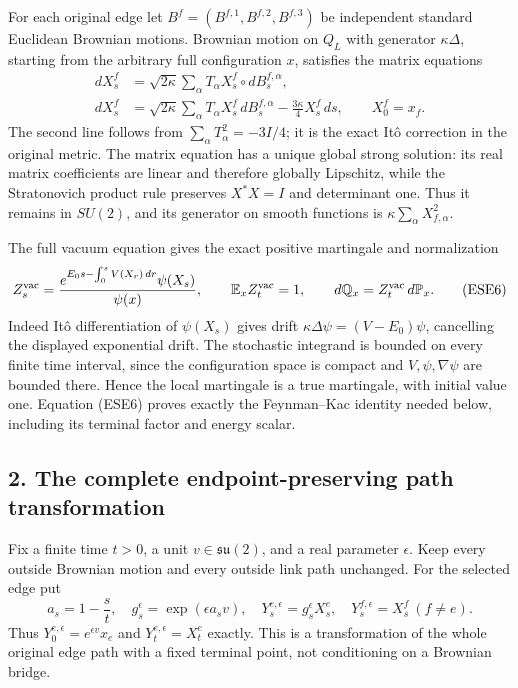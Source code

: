 \documentclass[11pt]{article}
\begin{document}
For each original edge let \(B^f=(B^{f,1},B^{f,2},B^{f,3})\) be independent standard Euclidean Brownian motions. Brownian motion on \(Q_L\) with generator \(\kappa\Delta\), starting from the arbitrary full configuration \(x\), satisfies the matrix equations
\[
 \begin{aligned}
 dX_s^f&=\sqrt{2\kappa}\sum_\alpha T_\alpha X_s^f\circ dB_s^{f,\alpha},\\
 dX_s^f&=\sqrt{2\kappa}\sum_\alpha T_\alpha X_s^f\,dB_s^{f,\alpha}
                     -\frac{3\kappa}{4}X_s^f\,ds,\qquad X_0^f=x_f.
 \end{aligned}\tag{ESE5}
\]
The second line follows from \(\sum_\alpha T_\alpha^2=-3I/4\); it is the exact Itô correction in the original metric. The matrix equation has a unique global strong solution: its real matrix coefficients are linear and therefore globally Lipschitz, while the Stratonovich product rule preserves \(X^*X=I\) and determinant one. Thus it remains in \(SU(2)\), and its generator on smooth functions is \(\kappa\sum_\alpha X_{f,\alpha}^2\).

The full vacuum equation gives the exact positive martingale and normalization
\[
 Z_s^{\rm vac}
  =\frac{e^{E_0s-\int_0^s V(X_r)\,dr}\psi(X_s)}{\psi(x)},
 \qquad \mathbb E_x Z_t^{\rm vac}=1,\qquad
 d\mathbb Q_x=Z_t^{\rm vac}\,d\mathbb P_x .
 \tag{ESE6}
\]
Indeed Itô differentiation of \(\psi(X_s)\) gives drift
\(\kappa\Delta\psi=(V-E_0)\psi\), cancelling the displayed exponential drift. The stochastic integrand is bounded on every finite time interval, since the configuration space is compact and \(V,\psi,\nabla\psi\) are bounded there. Hence the local martingale is a true martingale, with initial value one. Equation (ESE6) proves exactly the Feynman–Kac identity needed below, including its terminal factor and energy scalar.

\subsection*{2. The complete endpoint-preserving path transformation}

Fix a finite time \(t>0\), a unit \(v\in\mathfrak{su}(2)\), and a real parameter \(\epsilon\). Keep every outside Brownian motion and every outside link path unchanged. For the selected edge put
\[
 a_s=1-\frac{s}{t},\quad
 g_s^\epsilon=\exp(\epsilon a_s v),\quad
 Y_s^{e,\epsilon}=g_s^\epsilon X_s^e,\quad
 Y_s^{f,\epsilon}=X_s^f\ (f\ne e).
 \tag{ESE7}
\]
Thus \(Y_0^{e,\epsilon}=e^{\epsilon v}x_e\) and
\(Y_t^{e,\epsilon}=X_t^e\) exactly. This is a transformation of the whole original edge path with a fixed terminal point, not conditioning on a Brownian bridge.
\end{document}
